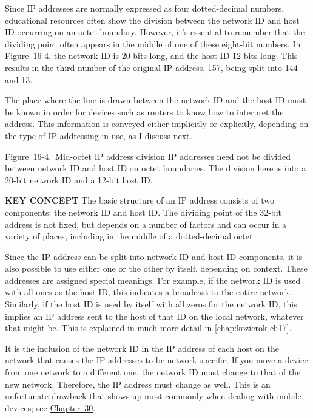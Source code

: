 Since IP addresses are normally expressed as four dotted-decimal
numbers, educational resources often show the division between the
network ID and host ID occurring on an octet boundary. However, it's
essential to remember that the dividing point often appears in the
middle of one of these eight-bit numbers. In
\protect\hyperlink{ch16s03.htmlux5cux23mid-octet_ip_address_division_ip_address}{Figure~16-4},
the network ID is 20 bits long, and the host ID 12 bits long. This
results in the third number of the original IP address, 157, being split
into 144 and 13.

The place where the line is drawn between the network ID and the host ID
must be known in order for devices such as routers to know how to
interpret the address. This information is conveyed either implicitly or
explicitly, depending on the type of IP addressing in use, as I discuss
next.


Figure~16-4.~Mid-octet IP address division IP addresses need not be
divided between network ID and host ID on octet boundaries. The division
here is into a 20-bit network ID and a 12-bit host ID.


{\textbf{KEY CONCEPT}} The basic structure of an IP address consists of
two components: the network ID and host ID. The dividing point of the
32-bit address is not fixed, but depends on a number of factors and can
occur in a variety of places, including in the middle of a
dotted-decimal octet.

Since the IP address can be split into network ID and host ID
components, it is also possible to use either one or the other by
itself, depending on context. These addresses are assigned special
meanings. For example, if the network ID is used with all ones as the
host ID, this indicates a broadcast to the entire network. Similarly, if
the host ID is used by itself with all zeros for the network ID, this
implies an IP address sent to the host of that ID on the local network,
whatever that might be.
This is explained in much more detail in \vref{chap:kozierok-ch17}.

It is the inclusion of the network ID in the IP address of each host on
the network that causes the IP addresses to be network-specific. If you
move a device from one network to a different one, the network ID must
change to that of the new network. Therefore, the IP address must change
as well. This is an unfortunate drawback that shows up most commonly
when dealing with mobile devices; see
\protect\hyperlink{ch30.html}{Chapter~30}.


